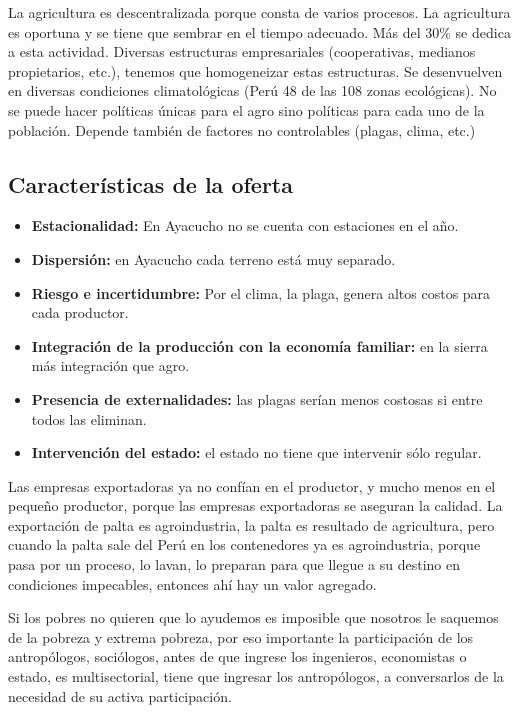 \documentclass[
  a4paper,
]{article}
\begin{document}
La agricultura es descentralizada porque consta de varios procesos. La
agricultura es oportuna y se tiene que sembrar en el tiempo adecuado.
Más del 30\% se dedica a esta actividad. Diversas estructuras
empresariales (cooperativas, medianos propietarios, etc.), tenemos que
homogeneizar estas estructuras. Se desenvuelven en diversas condiciones
climatológicas (Perú 48 de las 108 zonas ecológicas). No se puede hacer
políticas únicas para el agro sino políticas para cada uno de la
población. Depende también de factores no controlables (plagas, clima,
etc.)

\hypertarget{caracteruxedsticas-de-la-oferta}{%
\subsection{Características de la
oferta}\label{caracteruxedsticas-de-la-oferta}}

\begin{itemize}
\item
  \textbf{Estacionalidad:} En Ayacucho no se cuenta con estaciones en el
  año.
\item
  \textbf{Dispersión:} en Ayacucho cada terreno está muy separado.
\item
  \textbf{Riesgo e incertidumbre:} Por el clima, la plaga, genera altos
  costos para cada productor.
\item
  \textbf{Integración de la producción con la economía familiar:} en la
  sierra más integración que agro.
\item
  \textbf{Presencia de externalidades:} las plagas serían menos costosas
  si entre todos las eliminan.
\item
  \textbf{Intervención del estado:} el estado no tiene que intervenir
  sólo regular.
\end{itemize}

Las empresas exportadoras ya no confían en el productor, y mucho menos
en el pequeño productor, porque las empresas exportadoras se aseguran la
calidad. La exportación de palta es agroindustria, la palta es resultado
de agricultura, pero cuando la palta sale del Perú en los contenedores
ya es agroindustria, porque pasa por un proceso, lo lavan, lo preparan
para que llegue a su destino en condiciones impecables, entonces ahí hay
un valor agregado.

Si los pobres no quieren que lo ayudemos es imposible que nosotros le
saquemos de la pobreza y extrema pobreza, por eso importante la
participación de los antropólogos, sociólogos, antes de que ingrese los
ingenieros, economistas o estado, es multisectorial, tiene que ingresar
los antropólogos, a conversarlos de la necesidad de su activa
participación.
\end{document}
